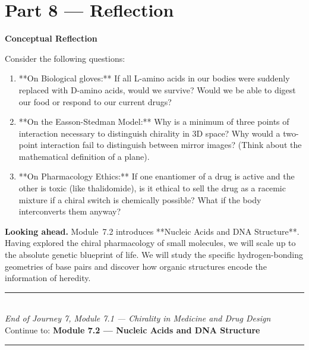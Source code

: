 \documentclass[12pt, a4paper]{book}
\begin{document}
\newpage

\section{Part 8 --- Reflection}

\begin{reflectionbox}
\textbf{Conceptual Reflection}

Consider the following questions:
\begin{enumerate}
  \item **On Biological gloves:** If all L-amino acids in our bodies were suddenly replaced with D-amino acids, would we survive? Would we be able to digest our food or respond to our current drugs?
  \item **On the Easson-Stedman Model:** Why is a minimum of three points of interaction necessary to distinguish chirality in 3D space? Why would a two-point interaction fail to distinguish between mirror images? (Think about the mathematical definition of a plane).
  \item **On Pharmacology Ethics:** If one enantiomer of a drug is active and the other is toxic (like thalidomide), is it ethical to sell the drug as a racemic mixture if a chiral switch is chemically possible? What if the body interconverts them anyway?
\end{enumerate}
\end{reflectionbox}

\medskip
\noindent\textbf{Looking ahead.}
Module~7.2 introduces **Nucleic Acids and DNA Structure**. Having explored the chiral pharmacology of small molecules, we will scale up to the absolute genetic blueprint of life. We will study the specific hydrogen-bonding geometries of base pairs and discover how organic structures encode the information of heredity.

\vspace{1.4cm}
\begin{center}
{\color{JourneyColor}\rule{0.5\linewidth}{0.8pt}}\\[6pt]
{\small\color{JourneyColor}\textit{End of Journey 7, Module 7.1 --- Chirality in Medicine and Drug Design}}\\[4pt]
{\small\color{JourneyColor}Continue to: \textbf{Module 7.2 --- Nucleic Acids and DNA Structure}}\\[6pt]
{\color{JourneyColor}\rule{0.5\linewidth}{0.8pt}}
\end{center}
\end{document}
